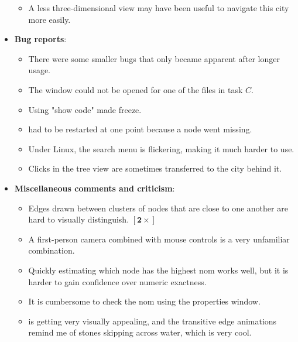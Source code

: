 \documentclass[../thesis]{subfiles}
\begin{document}
\begin{itemize}
\begin{itemize}
		      \item A less three-dimensional view may have been useful to navigate this city more easily.
	      \end{itemize}
	\item \textbf{Bug reports}:
	      \begin{itemize}
		      \item There were some smaller bugs that only became apparent after longer usage.
		      \item The \gls{window} could not be opened for one of the files in task $C$.
		      \item Using "show code" made \SEE{} freeze.
		      \item \SEE{} had to be restarted at one point because a node went missing.
		      \item Under Linux, the search menu is flickering, making it much harder to use.
		      \item Clicks in the tree view are sometimes transferred to the \gls{city} behind it.
	      \end{itemize}
	\item \textbf{Miscellaneous comments and criticism}:
	      \begin{itemize}
		      \item Edges drawn between clusters of nodes that are close to one another are hard to visually distinguish. $\bm{[2\times]}$
		      \item A first-person camera combined with mouse controls is a very unfamiliar combination.
		      \item Quickly estimating which node has the highest \gls{nom} works well, but it is harder to gain confidence over numeric exactness.
		      \item It is cumbersome to check the \gls{nom} using the properties window.
		      \item \SEE{} is getting very visually appealing, and the transitive edge animations remind me of stones skipping across water, which is very cool.
	      \end{itemize}
\end{itemize}
\end{document}
